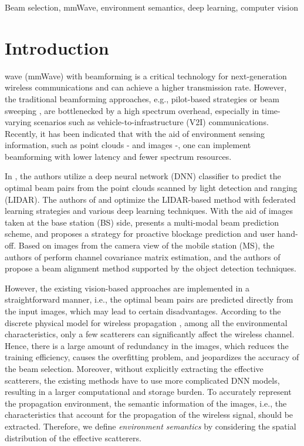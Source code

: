 \documentclass[lettersize,journal]{IEEEtran}
\begin{document}
\begin{IEEEkeywords}
Beam selection, mmWave, environment semantics, deep learning, computer vision
\end{IEEEkeywords}



\section{Introduction}
 wave (mmWave) with beamforming is a critical technology for next-generation wireless communications and can achieve a higher transmission rate.
However, the traditional beamforming approaches, e.g., pilot-based strategies \cite{estimation} or beam sweeping \cite{sweeping}, are bottlenecked by a high spectrum overhead,
especially in time-varying scenarios such as vehicle-to-infrastructure (V2I) communications.
Recently, it has been indicated that with the aid of environment sensing information, such as point clouds \cite{lidar}-\cite{lidarpos_baseline} and images \cite{visionpos}-\cite{visionblockage}, one can implement beamforming with lower latency and fewer spectrum resources.

In \cite{lidar}, the authors utilize a deep neural network (DNN) classifier to predict the optimal beam pairs from the point clouds scanned by light detection and ranging (LIDAR).
The authors of \cite{lidarfed} and \cite{lidarpos_baseline} optimize the LIDAR-based method with federated learning strategies and various deep learning techniques.
With the aid of images taken at the base station (BS) side, \cite{visionpos} presents a multi-modal beam prediction scheme, and \cite{visionblockage} proposes a strategy for proactive blockage prediction and user hand-off.
Based on images from the camera view of the mobile station (MS), the authors of \cite{visionccm} perform channel covariance matrix estimation, and the authors of \cite{vbala} propose a beam alignment method supported by the object detection techniques.

However, the existing vision-based approaches are implemented in a straightforward manner, i.e., the optimal beam pairs are predicted directly from the input images, which may lead to certain disadvantages.
According to the discrete physical model for wireless propagation \cite{channelmodel}, among all the environmental characteristics, only a few scatterers can significantly affect the wireless channel.
Hence, there is a large amount of redundancy in the images, which reduces the training efficiency, causes the overfitting problem, and jeopardizes the accuracy of the beam selection.
Moreover, without explicitly extracting the effective scatterers, the existing methods have to use more complicated DNN models, resulting in a larger computational and storage burden.
To accurately represent the propagation environment, the semantic information of the images, i.e., the characteristics that account for the propagation of the wireless signal, should be extracted. Therefore, we define \textit{environment semantics} by considering the spatial distribution of the effective scatterers.
\end{document}
